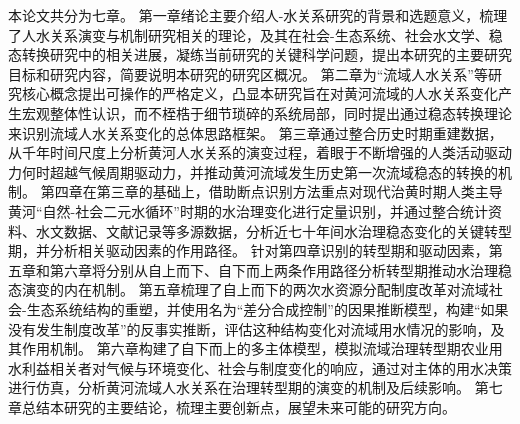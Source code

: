 本论文共分为七章。
第一章绪论主要介绍人-水关系研究的背景和选题意义，梳理了人水关系演变与机制研究相关的理论，及其在社会-生态系统、社会水文学、稳态转换研究中的相关进展，凝练当前研究的关键科学问题，提出本研究的主要研究目标和研究内容，简要说明本研究的研究区概况。
第二章为“流域人水关系”等研究核心概念提出可操作的严格定义，凸显本研究旨在对黄河流域的人水关系变化产生宏观整体性认识，而不桎梏于细节琐碎的系统局部，同时提出通过稳态转换理论来识别流域人水关系变化的总体思路框架。
第三章通过整合历史时期重建数据，从千年时间尺度上分析黄河人水关系的演变过程，着眼于不断增强的人类活动驱动力何时超越气候周期驱动力，并推动黄河流域发生历史第一次流域稳态的转换的机制。
第四章在第三章的基础上，借助断点识别方法重点对现代治黄时期人类主导黄河“自然-社会二元水循环”时期的水治理变化进行定量识别，并通过整合统计资料、水文数据、文献记录等多源数据，分析近七十年间水治理稳态变化的关键转型期，并分析相关驱动因素的作用路径。
针对第四章识别的转型期和驱动因素，第五章和第六章将分别从自上而下、自下而上两条作用路径分析转型期推动水治理稳态演变的内在机制。
第五章梳理了自上而下的两次水资源分配制度改革对流域社会-生态系统结构的重塑，并使用名为“差分合成控制”的因果推断模型，构建“如果没有发生制度改革”的反事实推断，评估这种结构变化对流域用水情况的影响，及其作用机制。
第六章构建了自下而上的多主体模型，模拟流域治理转型期农业用水利益相关者对气候与环境变化、社会与制度变化的响应，通过对主体的用水决策进行仿真，分析黄河流域人水关系在治理转型期的演变的机制及后续影响。
第七章总结本研究的主要结论，梳理主要创新点，展望未来可能的研究方向。